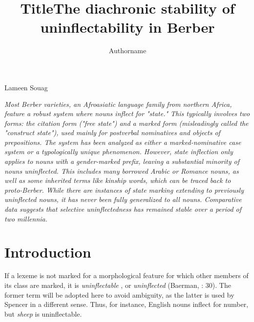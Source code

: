 \documentclass[output=paper]{langscibook}
\author{Authorname\orcid{}\affiliation{}}
\title{Title}
\begin{document}
\maketitle 

\title{The diachronic stability of uninflectability in Berber}

\begin{styleStandarduser}
Lameen Souag
\end{styleStandarduser}

\begin{styleStandarduser}
\textit{Most Berber varieties, an Afroasiatic language family from northern Africa, feature a robust system where nouns inflect for "state." This typically involves two forms: the citation form ("free state") and a marked form (misleadingly called the "construct state"), used mainly for postverbal nominatives and objects of prepositions. The system has been analyzed as either a marked-nominative case system or a typologically unique phenomenon. However, state inflection only applies to nouns with a gender-marked prefix, leaving a substantial minority of nouns uninflected. This includes many borrowed Arabic or Romance nouns, as well as some inherited terms like kinship words, which can be traced back to proto-Berber. While there are instances of state marking extending to previously uninflected nouns, it has never been fully generalized to all nouns. Comparative data suggests that selective uninflectedness has remained stable over a period of two millennia.}
\end{styleStandarduser}

\section{Introduction} %
\begin{styleStandarduser}
If a lexeme is not marked for a morphological feature for which other members of its class are marked, it is \textit{uninflectable} \citep{Spencer2020}, or \textit{uninflected} (Baerman, \citealt{BrownCorbett2005}: 30). The former term will be adopted here to avoid ambiguity, as the latter is used by Spencer in a different sense. Thus, for instance, English nouns inflect for number, but \textit{sheep} is uninflectable.
\end{styleStandarduser}
\end{document}
